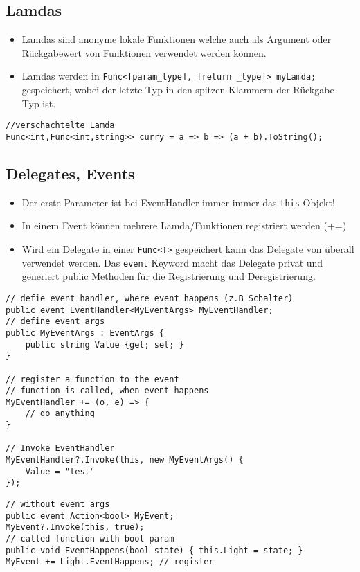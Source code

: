 \clearpage

\subsection{Lamdas}
\begin{itemize}
	\item Lamdas sind anonyme lokale Funktionen welche auch als Argument oder Rückgabewert von Funktionen verwendet werden können.
	\item Lamdas werden in \lstinline|Func<[param_type], [return _type]> myLamda;| gespeichert, wobei der letzte Typ in den spitzen Klammern der Rückgabe Typ ist.
\end{itemize}

\begin{lstlisting}
//verschachtelte Lamda
Func<int,Func<int,string>> curry = a => b => (a + b).ToString();
\end{lstlisting}

\subsection{Delegates, Events}
\begin{itemize}
	\item Der erste Parameter ist bei EventHandler immer immer das \lstinline|this| Objekt!
	\item In einem Event können mehrere Lamda/Funktionen registriert werden (+=)
	\item Wird ein Delegate in einer \lstinline|Func<T>| gespeichert kann das Delegate von überall verwendet werden. Das \lstinline|event| Keyword macht das Delegate privat und generiert public Methoden für die Registrierung und Deregistrierung.
\end{itemize}

\begin{lstlisting}
// defie event handler, where event happens (z.B Schalter)
public event EventHandler<MyEventArgs> MyEventHandler;
// define event args
public MyEventArgs : EventArgs {
	public string Value {get; set; }
}

// register a function to the event
// function is called, when event happens
MyEventHandler += (o, e) => {
	// do anything
}

// Invoke EventHandler
MyEventHandler?.Invoke(this, new MyEventArgs() {
	Value = "test"
});
\end{lstlisting}
\begin{lstlisting}
// without event args
public event Action<bool> MyEvent;
MyEvent?.Invoke(this, true);
// called function with bool param
public void EventHappens(bool state) { this.Light = state; }
MyEvent += Light.EventHappens; // register
\end{lstlisting}

